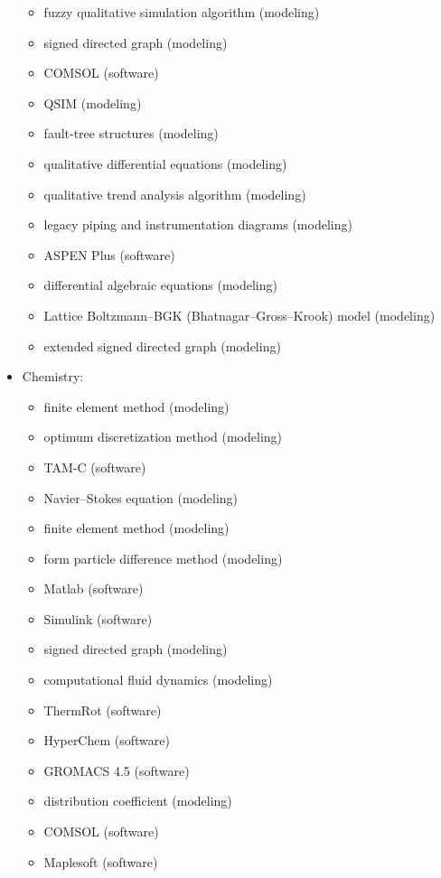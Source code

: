 \documentclass[utf8]{gradu3}
\begin{document}
\begin{itemize}
\begin{itemize}
        \item fuzzy qualitative simulation algorithm (modeling)
        \item signed directed graph (modeling)
        \item COMSOL (software)
        \item QSIM (modeling)
        \item fault-tree structures (modeling)
        \item qualitative differential equations (modeling)
        \item qualitative trend analysis algorithm (modeling)
        \item legacy piping and instrumentation diagrams (modeling)
        \item ASPEN Plus (software)
        \item differential algebraic equations (modeling)
        \item Lattice Boltzmann–BGK (Bhatnagar–Gross–Krook) model (modeling)
        \item extended signed directed graph (modeling)
    \end{itemize}
    \item Chemistry:
    \begin{itemize}
        \item finite element method (modeling)
        \item optimum discretization method (modeling)
        \item TAM-C (software)
        \item Navier–Stokes equation (modeling)
        \item finite element method (modeling)
        \item form particle difference method (modeling)
        \item Matlab (software)
        \item Simulink (software)
        \item signed directed graph (modeling)
        \item computational fluid dynamics (modeling)
        \item ThermRot (software)
        \item HyperChem (software)
        \item GROMACS 4.5 (software)
        \item distribution coefficient (modeling)
        \item COMSOL (software)
        \item Maplesoft (software)

\end{itemize}
\end{itemize}
\end{document}
